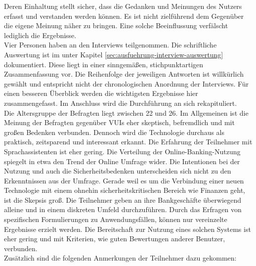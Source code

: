 Deren Einhaltung stellt sicher, dass die Gedanken und Meinungen des Nutzers erfasst und verstanden werden können. Es ist nicht zielführend dem Gegenüber die eigene Meinung näher zu bringen. Eine solche Beeinflussung verfälscht lediglich die Ergebnisse.\\ 
Vier Personen haben an den Interviews teilgenommen. Die schriftliche Auswertung ist im  unter Kapitel \ref{sec:ausfuehrung-interview-auswertung} dokumentiert. Diese liegt in einer sinngemäßen, stichpunktartigen Zusammenfassung vor. Die Reihenfolge der jeweiligen Antworten ist willkürlich gewählt und entspricht nicht der chronologischen Anordnung der Interviews. Für einen besseren Überblick werden die wichtigsten Ergebnisse hier zusammengefasst. Im Anschluss wird die Durchführung an sich rekapituliert.\\
Die Altersgruppe der Befragten liegt zwischen 22 und 26. Im Allgemeinen ist die Meinung der Befragten gegenüber \acp{VUI} eher skeptisch, befremdlich und mit großen Bedenken verbunden. Dennoch wird die Technologie durchaus als praktisch, zeitsparend und interessant erkannt. Die Erfahrung der Teilnehmer mit Sprachassistenten ist eher gering. Die Verteilung der Online-Banking-Nutzung spiegelt in etwa den Trend der Online Umfrage wider. Die Intentionen bei der Nutzung und auch die Sicherheitsbedenken unterscheiden sich nicht zu den Erkenntnissen aus der Umfrage. Gerade weil es um die Verbindung einer neuen Technologie mit einem ohnehin sicherheitskritischen Bereich wie Finanzen geht, ist die Skepsis groß. Die Teilnehmer geben an ihre Bankgeschäfte überwiegend alleine und in einem diskreten Umfeld durchzuführen. Durch das Erfragen von spezifischen Formulierungen zu Anwendungsfällen, können nur vereinzelte Ergebnisse erzielt werden. Die Bereitschaft zur Nutzung eines solchen Systems ist eher gering und mit Kriterien, wie \zB guten Bewertungen anderer Benutzer, verbunden.\\ 
Zusätzlich sind die folgenden Anmerkungen der Teilnehmer dazu gekommen:

